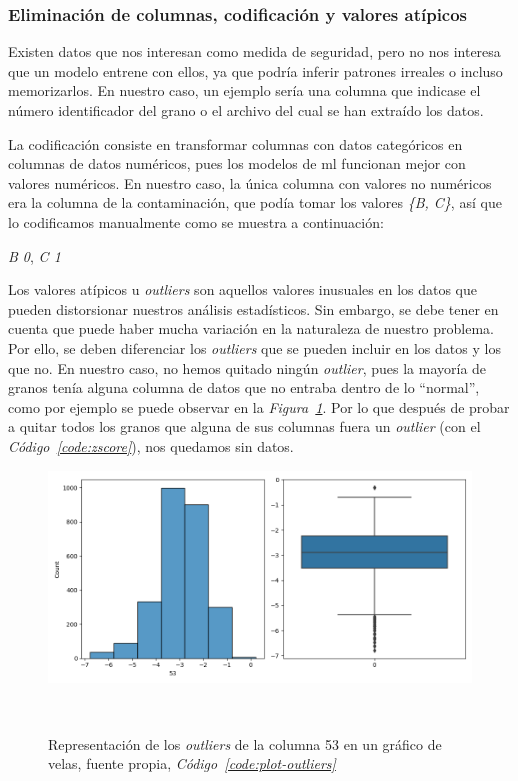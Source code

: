 \subsubsection{Eliminación de columnas, codificación y valores atípicos}

Existen datos que nos interesan como medida de seguridad, pero no nos interesa que un modelo entrene con ellos, ya que podría inferir patrones irreales o incluso memorizarlos. En nuestro caso, un ejemplo sería una columna que indicase el número identificador del grano o el archivo del cual se han extraído los datos.

La codificación consiste en transformar columnas con datos categóricos en columnas de datos numéricos, pues los modelos de \acrshort{ml} funcionan mejor con valores numéricos. En nuestro caso, la única columna con valores no numéricos era la columna de la contaminación, que podía tomar los valores \textit{\{B, C\}}, así que lo codificamos manualmente como se muestra a continuación:

{
    \centering
    \textit{B \longrightarrow{} 0}, \textit{C \longrightarrow{} 1}\par
}

Los valores atípicos u \textit{outliers} son aquellos valores inusuales en los datos que pueden distorsionar nuestros análisis estadísticos. Sin embargo, se debe tener en cuenta que puede haber mucha variación en la naturaleza de nuestro problema. Por ello, se deben diferenciar los \textit{outliers} que se pueden incluir en los datos y los que no. En nuestro caso, no hemos quitado ningún \textit{outlier}, pues la mayoría de granos tenía alguna columna de datos que no entraba dentro de lo ``normal'', como por ejemplo se puede observar en la \textit{Figura\ \ref{fig:outliers}}. Por lo que después de probar a quitar todos los granos que alguna de sus columnas fuera un \textit{outlier} (con el \textit{Código\ \ref{code:zscore}}), nos quedamos sin datos.

\begin{figure}[!h]
    \centering
    \includegraphics[width=0.7\linewidth]{media/images/col-53-outliers.png}
    \caption{Representación de los \textit{outliers} de la columna 53 en un gráfico de velas, fuente propia, \textit{Código\ \ref{code:plot-outliers}}}\ \label{fig:outliers}
\end{figure}



